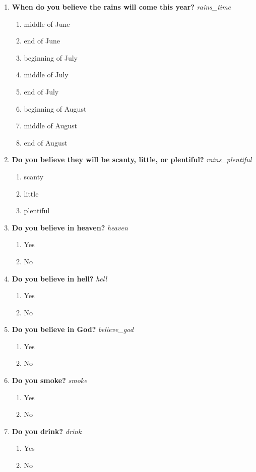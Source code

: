 \documentclass{article}
\begin{document}
\begin{enumerate}
\item {\bfseries When do you believe the rains will come this year?}\emph{ rains\_time }
\begin{enumerate}
\item middle of June
\item end of June
\item beginning of July
\item middle of July
\item end of July
\item beginning of August
\item middle of August
\item end of August
\end{enumerate}
\item {\bfseries Do you believe they will be scanty, little, or plentiful?}\emph{ rains\_plentiful }
\begin{enumerate}
\item scanty
\item little
\item plentiful
\end{enumerate}
\item {\bfseries Do you believe in heaven?}\emph{ heaven }
\begin{enumerate}
\item Yes
\item No
\end{enumerate}
\item {\bfseries Do you believe in hell?}\emph{ hell }
\begin{enumerate}
\item Yes
\item No
\end{enumerate}
\item {\bfseries Do you believe in God?}\emph{ believe\_god }
\begin{enumerate}
\item Yes
\item No
\end{enumerate}
\item {\bfseries Do you smoke?}\emph{ smoke }
\begin{enumerate}
\item Yes
\item No
\end{enumerate}
\item {\bfseries Do you drink?}\emph{ drink }
\begin{enumerate}
\item Yes
\item No

\end{enumerate}
\end{enumerate}
\end{document}
